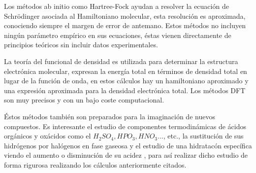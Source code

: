 Los métodos ab initio como Hartree-Fock ayudan a resolver la ecuación de Schrödinger asociada al Hamiltoniano molecular, esta resolución es aproximada, conociendo siempre el margen de error de antemano. Estos métodos no incluyen ningún parámetro empírico en sus ecuaciones, éstas vienen directamente de principios teóricos sin incluir datos experimentales.

La teoría del funcional de densidad es utilizada para determinar la estructura electrónica molecular, expresan la energía total en términos de densidad total en lugar de la función de onda, en estos cálculos hay un hamiltoniano aproximado y una expresión aproximada para la densidad electrónica total. Los métodos DFT son muy precisos y con un bajo coste computacional.

Éstos métodos también son preparados para la imaginación de nuevos compuestos. Es interesante el estudio de componentes termodinámicas de ácidos orgánicos y oxácidos como el $H_2SO_4, HPO_3, HNO_3...$, etc., la sustitución de sus hidrógenos por halógenos en fase gaseosa y el estudio de una hidratacón específica viendo el aumento o disminución de su acidez \cite{quimica3}, para así realizar dicho estudio de forma rigurosa realizando los cálculos anteriormente citados.